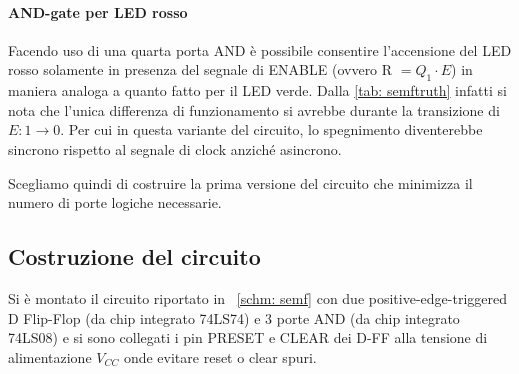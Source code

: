 \documentclass[10pt, a4paper, italian]{article}
\begin{document}
\paragraph{AND-gate per LED rosso}
Facendo uso di una quarta porta AND è possibile consentire l'accensione del LED
rosso solamente in presenza del segnale di ENABLE (ovvero R $= Q_1 \cdot E$) in
maniera analoga a quanto fatto per il LED verde.
Dalla \cref{tab: semftruth} infatti si nota che l'unica differenza di
funzionamento si avrebbe durante la transizione di $E: 1 \to 0$.
Per cui in questa variante del circuito, lo spegnimento diventerebbe sincrono
rispetto al segnale di clock anziché asincrono.

Scegliamo quindi di costruire la prima versione del circuito che minimizza il
numero di porte logiche necessarie.

\subsection{Costruzione del circuito}
Si è montato il circuito riportato in ~\cref{schm: semf} con due
positive-edge-triggered D Flip-Flop (da chip integrato 74LS74) e 3 porte AND
(da chip integrato 74LS08) e si sono collegati i pin PRESET e CLEAR dei D-FF
alla tensione di alimentazione $V_{CC}$ onde evitare reset o clear spuri.
\end{document}
